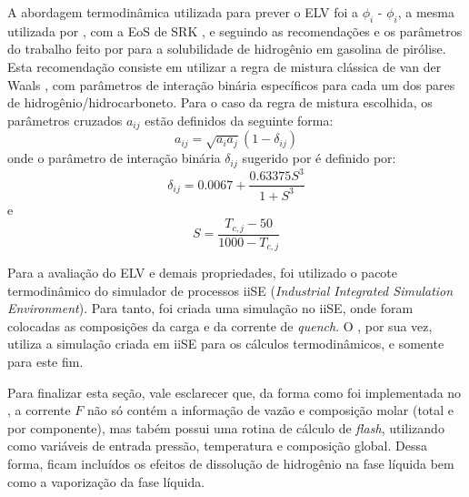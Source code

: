 A abordagem termodinâmica utilizada para prever o ELV foi a $\phi_i$ -
$\phi_i$, a mesma utilizada por , com a EoS de SRK
\cite{Soave1972}, e seguindo as recomendações e os parâmetros do trabalho feito
por  para a solubilidade de hidrogênio em gasolina de
pirólise. Esta recomendação consiste em utilizar a regra de mistura clássica de
van der Waals \cite{VanderWaals1873}, com parâmetros de interação binária
específicos para cada um dos pares de hidrogênio/hidrocarboneto. Para o caso da
regra de mistura escolhida, os parâmetros cruzados $a_{ij}$ estão definidos
da seguinte forma\cite{Peng1976,Soave1972}:
\begin{equation}
a_{ij} = \sqrt{a_ia_j}(1-\delta_{ij})
\label{eq:parametroaij}
\end{equation}
onde o parâmetro de interação binária $\delta_{ij}$ sugerido por
 é definido por:
\begin{equation}
\delta_{ij} = \num{0,0067}+\dfrac{\num{0,63375}S^3}{1+S^3}
\label{eq:deltaij}
\end{equation}
e
\begin{equation}
S = \dfrac{T_{c,j}-\num{50}}{\num{1000}-T_{c,j}}
\label{eq:deltaij}
\end{equation}

Para a avaliação do ELV e demais propriedades, foi utilizado o pacote
termodinâmico do simulador de processos iiSE (\emph{Industrial Integrated
Simulation Environment}). Para tanto, foi criada uma simulação no iiSE, onde
foram colocadas as composições da carga e da corrente de \emph{quench}. O \emso,
por sua vez, utiliza a simulação criada em iiSE para os cálculos termodinâmicos,
e somente para este fim. 

Para finalizar esta seção, vale esclarecer que, da forma como foi implementada
no \emso, a corrente $F$ não só contém a informação de vazão e composição molar
(total e por componente), mas tabém possui uma rotina de cálculo de
\emph{flash}, utilizando como variáveis de entrada pressão, temperatura e
composição global. Dessa forma, ficam incluídos os efeitos de dissolução de
hidrogênio na fase líquida bem como a vaporização da fase líquida.



